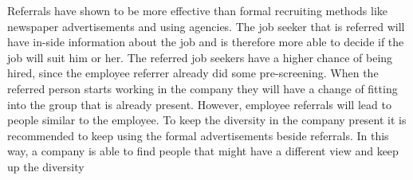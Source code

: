 \documentclass[main.tex]{subfiles}
\begin{document}
Referrals have shown to be more effective than formal recruiting methods like newspaper advertisements and using agencies.
The job seeker that is referred will have in-side information about the job and is therefore more able to decide if the job will suit him or her.
The referred job seekers have a higher chance of being hired, since the employee referrer already did some pre-screening.
When the referred person starts working in the company they will have a change of fitting into the group that is already present. 
However, employee referrals will lead to people similar to the employee.
To keep the diversity in the company present it is recommended to keep using the formal advertisements beside referrals. 
In this way, a company is able to find people that might have a different view and keep up the diversity
\end{document}
